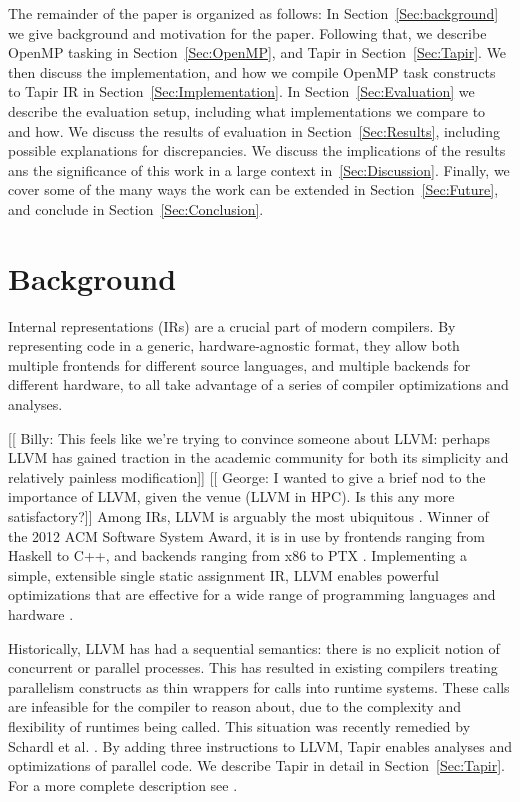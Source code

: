 \documentclass[sigconf]{acmart}
\newcommand{\wmnote}[1]{{\scriptsize \color{red} [[ Billy: #1]]}}
\newcommand{\gsnote}[1]{{\scriptsize \color{blue} [[ George: #1]]}}
\begin{document}
The remainder of the paper is organized as follows: In Section~\ref{Sec:background} 
we give background and motivation for the paper. Following that, we describe OpenMP
tasking in Section~\ref{Sec:OpenMP}, and Tapir in Section~\ref{Sec:Tapir}. We then 
discuss the implementation, and how we compile OpenMP task constructs to Tapir IR in
Section~\ref{Sec:Implementation}. In Section~\ref{Sec:Evaluation} we describe the 
evaluation setup, including what implementations we compare to and how. We discuss
the results of evaluation in Section~\ref{Sec:Results}, including possible
explanations for discrepancies. We discuss the implications of the results ans the
significance of this work in a large context in~\ref{Sec:Discussion}. Finally,
we cover some of the many ways the work can be extended in
Section~\ref{Sec:Future}, and conclude in Section~\ref{Sec:Conclusion}.

\section{Background} \label{Sec:Background}

Internal representations (IRs) are a crucial part of modern compilers.  By
representing code in a generic, hardware-agnostic format, they allow both
multiple frontends for different source languages, and multiple backends for
different hardware, to all take advantage of a series of compiler optimizations
and analyses. 

\wmnote{This feels like we're trying to convince someone about LLVM: perhaps
LLVM has gained traction in the academic community for both its simplicity and
relatively painless modification} 
\gsnote{I wanted to give a brief nod to the importance of LLVM, given the venue
(LLVM in HPC). Is this any more satisfactory?} 
Among IRs, LLVM is arguably the most ubiquitous \cite{llvm}. Winner of the
2012 ACM Software System Award, it is in use by frontends ranging from Haskell
to C++, and backends ranging from x86 to PTX \cite{}. Implementing a simple,
extensible single static assignment IR, LLVM enables powerful optimizations
that are effective for a wide range of programming languages and hardware
\cite{llvm}. 

Historically, LLVM has had a sequential semantics: there is no explicit notion
of concurrent or parallel processes. This has resulted in existing compilers
treating parallelism constructs as thin wrappers for calls into runtime
systems. These calls are infeasible for the compiler to reason about, due to
the complexity and flexibility of runtimes being called. This situation was
recently remedied by Schardl et al.  \cite{tapir}. By adding three instructions
to LLVM, Tapir enables analyses and optimizations of parallel code. We describe
Tapir in detail in Section~\ref{Sec:Tapir}. For a more complete description see
\cite{tapir}. 
\end{document}
